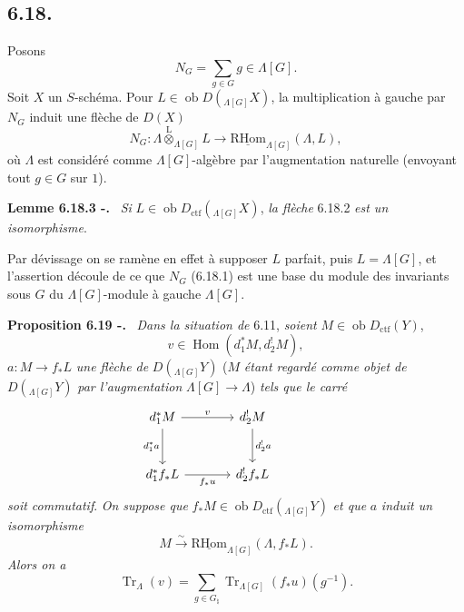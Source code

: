 \documentclass[11pt]{article}
\newenvironment{statement}[1]{\par\medskip\noindent\textbf{#1.}\ }{\par\medskip}
\DeclareMathOperator{\Hom}{Hom}
\newcommand{\R}{\mathrm{R}}\newcommand{\RHomCore}{\mathrm{RHom}}
\providecommand{\RHom}{\RHomCore}
\providecommand{\uRHom}{\underline{\RHom}}
\providecommand{\Tr}{\operatorname{Tr}}
\providecommand{\Tr}{\operatorname{Tr}}
\providecommand{\lten}{\overset{\mathrm L}{\otimes}}
\providecommand{\Ob}{\operatorname{ob}}
\providecommand{\Tr}{\operatorname{Tr}}
\providecommand{\RHom}{\RHomCore}
\providecommand{\Hom}{\operatorname{Hom}}
\providecommand{\lten}{\overset{\mathrm L}{\otimes}}
\providecommand{\RHom}{\R\mathcal{H}om}
\providecommand{\lten}{\overset{\mathrm L}{\otimes}}
\providecommand{\Ob}{\operatorname{ob}}
\providecommand{\R}{\mathrm R}
\providecommand{\Tr}{\operatorname{Tr}}
\providecommand{\lten}{\overset{\mathrm L}{\otimes}}
\providecommand{\lten}{\overset{\mathrm L}{\otimes}}
\providecommand{\Ob}{\operatorname{Ob}}
\providecommand{\lten}{\overset{\mathrm L}{\otimes}}
\providecommand{\RHom}{\RHomCore}
\providecommand{\Hom}{\operatorname{Hom}}
\providecommand{\Tr}{\operatorname{Tr}}
\providecommand{\Ob}{\operatorname{ob}}
\providecommand{\Ob}{\operatorname{Ob}}
\providecommand{\lten}{\overset{\mathrm L}{\otimes}}
\begin{document}
\subsection*{6.18.}
Posons
\begin{equation}
N_G=\sum_{g\in G} g\in\Lambda[G].
\tag{6.18.1}
\end{equation}
Soit $X$ un $S$-schéma. Pour $L\in\Ob D({}_{\Lambda[G]}X)$, la multiplication à gauche par $N_G$ induit une flèche de $D(X)$
\begin{equation}
N_G:\Lambda\lten_{\Lambda[G]}L
\longrightarrow
\uRHom_{\Lambda[G]}(\Lambda,L),
\tag{6.18.2}
\end{equation}
où $\Lambda$ est considéré comme $\Lambda[G]$-algèbre par l'augmentation naturelle (envoyant tout $g\in G$ sur $1$).

\begin{statement}{Lemme 6.18.3 -}
\emph{Si} $L\in\Ob D_{\mathrm{ctf}}({}_{\Lambda[G]}X)$, \emph{la flèche} 6.18.2 \emph{est un isomorphisme}.
\end{statement}

Par dévissage on se ramène en effet à supposer $L$ parfait, puis $L=\Lambda[G]$, et l'assertion découle de ce que $N_G$ (6.18.1) est une base du module des invariants sous $G$ du $\Lambda[G]$-module à gauche $\Lambda[G]$.

\begin{statement}{Proposition 6.19 -}
\emph{Dans la situation de} 6.11, \emph{soient} $M\in\Ob D_{\mathrm{ctf}}(Y)$,
\[
v\in\Hom(d_1^*M,d_2^!M),
\]
$a:M\to f_*L$ \emph{une flèche de} $D({}_{\Lambda[G]}Y)$ ($M$ \emph{étant regardé comme objet de} $D({}_{\Lambda[G]}Y)$ \emph{par l'augmentation} $\Lambda[G]\to\Lambda$) \emph{tels que le carré}
\[
\begin{tikzcd}[column sep=large,row sep=large]
d_1^*M \arrow[r,"v"] \arrow[d,"d_1^*a"'] & d_2^!M \arrow[d,"d_2^!a"] & {}\\
d_1^*f_*L \arrow[r,"f_*u"'] & d_2^!f_*L
\end{tikzcd}
\]
\emph{soit commutatif}. \emph{On suppose que} $f_*M\in\Ob D_{\mathrm{ctf}}({}_{\Lambda[G]}Y)$ \emph{et que} $a$ \emph{induit un isomorphisme}
\[
M\xrightarrow{\sim}\uRHom_{\Lambda[G]}(\Lambda,f_*L).
\]
\emph{Alors on a}
\begin{equation}
\Tr_{\Lambda}(v)=
\sum_{g\in G_{\natural}}\Tr_{\Lambda[G]}(f_*u)(g^{-1}).
\tag{6.19.1}
\end{equation}
\end{statement}
\end{document}
